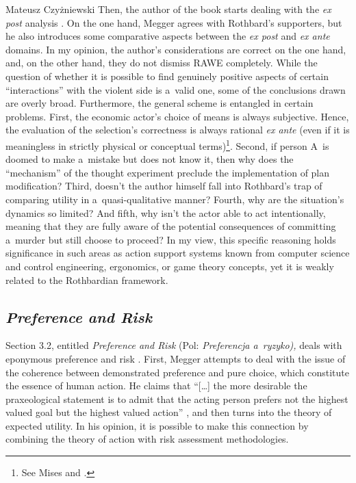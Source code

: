 \begin{newrevengenv}{Mateusz Czyżniewski}
Then, the author of the book starts dealing with the \textit{ex post} analysis 
\parencite[][pp.70–72]{megger_sprawiedliwosc_2021}. %
 On the one hand, Megger agrees with Rothbard's supporters, but he also introduces some comparative aspects between the \textit{ex post} and \textit{ex ante} domains. In my opinion, the author's considerations are correct on the one hand, and, on the other hand, they do not dismiss RAWE completely. While the question of whether it is possible to find genuinely positive aspects of certain ``interactions'' with the violent side is a~valid one, some of the conclusions drawn are overly broad. Furthermore, the general scheme is entangled in certain problems. First, the economic actor's choice of means is always subjective. Hence, the evaluation of the selection's correctness is always rational \textit{ex ante} (even if it is meaningless in strictly physical or conceptual terms)\footnote{See Mises 
\parencite[pp.13–23][]{mises_human_1998} %
 and 
\parencite[pp.264–271][]{mises_theory_1997}.%
}. Second, if person A~is doomed to make a~mistake but does not know it, then why does the ``mechanism'' of the thought experiment preclude the implementation of plan modification? Third, doesn't the author himself fall into Rothbard's trap of comparing utility in a~quasi-qualitative manner? Fourth, why are the situation's dynamics so limited? And fifth, why isn't the actor able to act intentionally, meaning that they are fully aware of the potential consequences of committing a~murder but still choose to proceed? In my view, this specific reasoning holds significance in such areas as action support systems known from computer science and control engineering, ergonomics, or game theory concepts, yet it is weakly related to the Rothbardian framework.



\subsection{\itshape Preference and Risk }



Section 3.2, entitled \textit{Preference and Risk} (Pol: \textit{Preferencja a~ryzyko),} deals with eponymous preference and risk 
\parencite[][pp.73–82]{megger_sprawiedliwosc_2021}. %
 First, Megger attempts to deal with the issue of the coherence between demonstrated preference and pure choice, which constitute the essence of human action. He claims that ``[…] the more desirable the praxeological statement is to admit that the acting person prefers not the highest valued goal but the highest valued action'' 
\parencite[][p.74]{megger_sprawiedliwosc_2021}, %
 and then turns into the theory of expected utility. In his opinion, it is possible to make this connection by combining the theory of action with risk assessment methodologies.




\end{newrevengenv}
